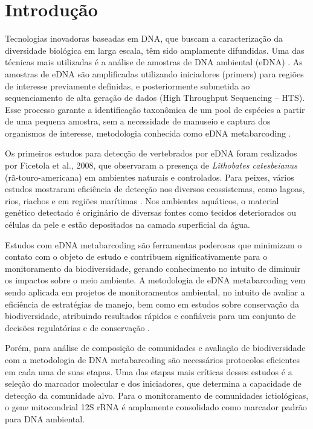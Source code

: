 \section{Introdução}
\label{section:intro}

Tecnologias inovadoras baseadas em DNA, que buscam a caracterização da diversidade biológica em larga escala, têm sido amplamente difundidas. Uma das técnicas mais utilizadas é a análise de amostras de DNA ambiental (eDNA) \cite{Ficetola.etal2008}. As amostras de eDNA são amplificadas utilizando iniciadores (primers) para regiões de interesse previamente definidas, e posteriormente submetida ao sequenciamento de alta geração de dados (High Throughput Sequencing – HTS). Esse processo garante a identificação taxonômica de um pool de espécies a partir de uma pequena amostra, sem a necessidade de manuseio e captura dos organismos de interesse, metodologia conhecida como eDNA metabarcoding \cite{Cristescu2014,Deiner.etal2017,Fahner.etal2016}.

Os primeiros estudos para detecção de vertebrados por eDNA foram realizados por Ficetola et al., 2008, que observaram a presença de \textit{Lithobates catesbeianus} (rã-touro-americana) em ambientes naturais e controlados. Para peixes, vários estudos mostraram eficiência de detecção nos diversos ecossistemas, como lagoas, rios, riachos e em regiões marítimas \cite{Takahara.etal2013,Sigsgaard.etal2015,Minamoto.etal2012,Thomsen.etal2012,Kelly.etal2014}. Nos ambientes aquáticos, o material genético detectado é originário de diversas fontes como tecidos deteriorados ou células da pele e estão depositados na camada superficial da água. 

Estudos com eDNA metabarcoding são ferramentas poderosas que minimizam o contato com o objeto de estudo e contribuem significativamente para o monitoramento da biodiversidade, gerando conhecimento no intuito de diminuir os impactos sobre o meio ambiente. A metodologia de eDNA metabarcoding vem sendo aplicada em projetos de monitoramentos ambiental, no intuito de avaliar a eficiência de estratégias de manejo, bem como em estudos sobre conservação da biodiversidade, atribuindo resultados rápidos e confiáveis para um conjunto de decisões regulatórias e de conservação \cite{Oliveira.etal2023}.

Porém, para análise de composição de comunidades e avaliação de biodiversidade com a metodologia de DNA metabarcoding são necessários protocolos eficientes em cada uma de suas etapas. Uma das etapas mais críticas  desses estudos é a seleção do marcador molecular e dos iniciadores, que determina a capacidade de detecção da comunidade alvo. Para o monitoramento de comunidades ictiológicas, o gene mitocondrial 12S rRNA é amplamente consolidado como marcador padrão para DNA ambiental.

